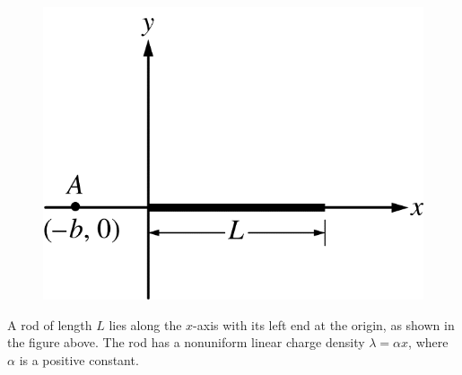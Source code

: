 %
\begin{figure}[H]
\centering
\includegraphics[scale=0.3]{images/img-016-043.png}
\end{figure}


\question
A rod of length $L$ lies along the $x$-axis with its left end at the origin, as shown in the figure above. The rod has a nonuniform linear charge density $\lambda=\alpha x$, where $\alpha$ is a positive constant. %

